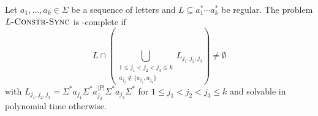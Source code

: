  
\begin{theoremrep}
\label{thm:dichotomy}
 Let $a_1, \ldots, a_k \in \Sigma$ be a sequence of letters
 and $L \subseteq a_1^* \cdots a_k^*$ be regular.
 The problem $L\textsc{-Constr-Sync}$
 is \NP-complete if
 \[
  L \cap \left(\bigcup_{\substack{1 \le j_1 < j_2 < j_3 \le k \\ a_{j_2} \notin \{a_{j_1}, a_{j_3}\} }} L_{j_1,j_2,j_3} \right) \ne \emptyset
 \]
 with $L_{j_1, j_2, j_3} = \Sigma^* a_{j_1} \Sigma^* a_{j_2}^{|P|} \Sigma^* a_{j_3} \Sigma^*$
 for $1 \le j_1 < j_2 < j_3 \le k$ and solvable in polynomial time otherwise.
\end{theoremrep}
